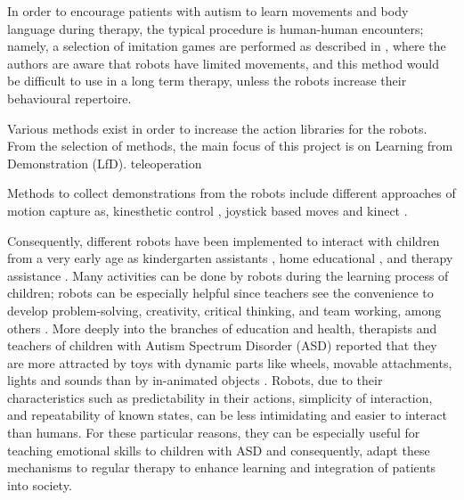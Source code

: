 \documentclass[thesis]{mas_proposal}
\begin{document}
\begin{itemize}
    In order to encourage patients with autism to learn movements and body language during therapy, the typical procedure is human-human encounters; namely, a selection of imitation games are performed as described in \cite{dautenhahn2004}, where the authors are aware that robots have limited movements, and this method would be difficult to use in a long term therapy, unless the robots increase their behavioural repertoire.
    
    Various methods exist in order to increase the action libraries for the robots. From the selection of methods, the main focus of this project is on Learning from Demonstration (LfD).
    teleoperation \cite{si2021}
    
    Methods to collect demonstrations from the robots include different approaches of motion capture as, kinesthetic control \cite{kronander2013}, joystick based moves \cite{Jiang2013} and kinect \cite{assad2020}.
    
    Consequently, different robots have been implemented to interact with children from a very early age as kindergarten assistants \cite{Oliveira2016}, home educational \cite{Jeonghye2005}, and therapy assistance \cite{Vulpe2021}. Many activities can be done by robots during the learning process of children; robots can be especially helpful since teachers see the convenience to develop problem-solving, creativity, critical thinking, and team working, among others \cite{Vostinar2019}. More deeply into the branches of education and health, therapists and teachers of children with Autism Spectrum Disorder (ASD) reported that they are more attracted by toys with dynamic parts like wheels, movable attachments, lights and sounds than by in-animated objects \cite{Qidwai2013}. Robots, due to their characteristics such as predictability in their actions, simplicity of interaction, and repeatability of known states, can be less intimidating and easier to interact than humans. For these particular reasons, they can be especially useful for teaching emotional skills to children with ASD \cite{costa2017socially} and consequently, adapt these mechanisms to regular therapy to enhance learning and integration of patients into society.
    

\end{itemize}
\end{document}

